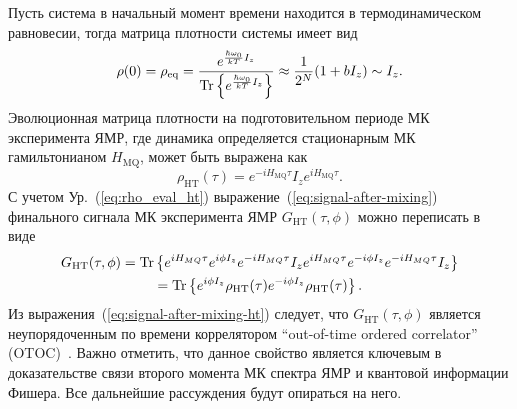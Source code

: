 Пусть система в начальный момент времени находится в термодинамическом равновесии,
тогда матрица плотности системы имеет вид
%
\begin{equation}
  \label{eq:rho_eq}
  \rho(0)
  = \rho_{\mathrm{eq}}
  = \dfrac{
    e^{\frac{\hbar\omega_{0}}{kT} I_z}
  }{
    \mathrm{Tr} \left\{ e^{\frac{\hbar\omega_{0}}{kT} I_z} \right\}
  }
  \approx \dfrac{1}{2^N} (1 + bI_z)
  \sim I_z.
\end{equation}
%
Эволюционная матрица плотности на подготовительном периоде МК эксперимента ЯМР,
где динамика определяется стационарным МК гамильтонианом $H_\mathrm{MQ}$,
может быть выражена как
%
\begin{equation}\label{eq:rho_eval_ht}
  \rho_\mathrm{HT} (\tau)
   =  e^{-iH_\mathrm{MQ}\tau} I_z e^{iH_\mathrm{MQ}\tau}.
\end{equation}
%
С учетом Ур.~(\ref{eq:rho_eval_ht}) выражение~(\ref{eq:signal-after-mixing})
финального сигнала МК эксперимента ЯМР $G_\mathrm{HT}(\tau,\phi)$ можно переписать в виде
%
\begin{multline}\label{eq:signal-after-mixing-ht}
  G_\mathrm{HT}(\tau,\phi)
  = \mathrm{Tr} \left\{ 
  	e^{iH_{MQ}\tau} e^{i\phi I_z} e^{-iH_{MQ}\tau} I_z
  	e^{iH_{MQ}\tau} e^{-i\phi I_z} e^{-iH_{MQ}\tau} I_z
   \right\}
  \\
  = \mathrm{Tr} \left\{ 
    e^{i\phi I_z} \rho_\mathrm{HT}(\tau)
    e^{-i\phi I_z}\rho_\mathrm{HT}(\tau)
   \right\}.
\end{multline}
%
Из выражения~(\ref{eq:signal-after-mixing-ht}) следует,
что $G_\mathrm{HT}(\tau, \phi)$ является неупорядоченным по времени коррелятором ``out-of-time ordered correlator'' (OTOC)~\cite{Garttner2018, Doronin2019}.
Важно отметить, что данное свойство является ключевым в доказательстве связи
второго момента МК спектра ЯМР и квантовой информации Фишера.
Все дальнейшие рассуждения будут опираться на него.

